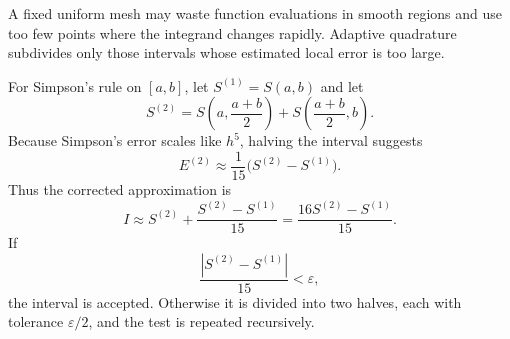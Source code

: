 A fixed uniform mesh may waste function evaluations in smooth regions and use too few points where the integrand changes rapidly.  Adaptive quadrature subdivides only those intervals whose estimated local error is too large.

For Simpson's rule on $[a,b]$, let $S^{(1)}=S(a,b)$ and let
\[
 S^{(2)}=S\left(a,\frac{a+b}{2}\right)
 +S\left(\frac{a+b}{2},b\right).
\]
Because Simpson's error scales like $h^5$, halving the interval suggests
\[
 E^{(2)}\approx\frac1{15}\bigl(S^{(2)}-S^{(1)}\bigr).
\]
Thus the corrected approximation is
\[
 I\approx S^{(2)}+\frac{S^{(2)}-S^{(1)}}{15}
 =\frac{16S^{(2)}-S^{(1)}}{15}.
\]
If
\[
 \frac{|S^{(2)}-S^{(1)}|}{15}<\varepsilon,
\]
the interval is accepted.  Otherwise it is divided into two halves, each with tolerance $\varepsilon/2$, and the test is repeated recursively.
